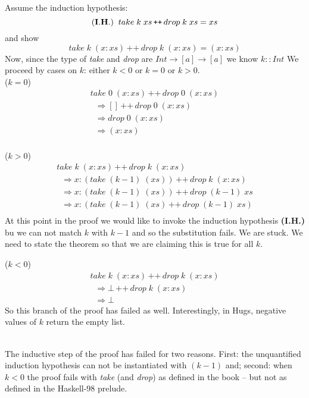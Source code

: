 \documentclass[11pt]{article}
\newcommand{\append}{\,{\texttt{++}}\,}
\begin{document}
 Assume  the induction hypothesis:
\[{\bf{(I.H.)}} \;\; take\; k\; xs \append drop\; k\; xs = xs \]
and show
\[take\; k\; (x:xs) \append drop\; k\; (x:xs) = (x:xs) \]
Now, since the type of {\it{take}} and {\it{drop}} are $Int \rightarrow [a]
\rightarrow [a]$ we know $k::Int$ We proceed by cases on $k$: either $k<0$ or
$k=0$ or $k>0$.\\
($k = 0$)
\[\begin{array}{l}
take\; 0\; (x:xs) \append drop\; 0\; (x:xs)\\
\;\;\Rightarrow [] \append drop \; 0\; (x:xs) \\
\;\;\Rightarrow drop \; 0\; (x:xs) \\
\;\;\Rightarrow (x:xs) \\
\end{array}\]


($k > 0$)
\[\begin{array}{l}
take\; k\; (x:xs) \append drop\; k\; (x:xs) \\
\;\;\Rightarrow x:(take\; (k-1)\; (xs)) \append drop \; k\; (x:xs) \\
\;\;\Rightarrow x:(take\; (k-1)\; (xs)) \append drop \; (k-1)\; xs \\
\;\;\Rightarrow x:(take\; (k-1)\; (xs) \append drop \; (k-1)\; xs) \\
\end{array}\]
At this point in the proof we would like to invoke the induction hypothesis
{\bf{(I.H.)}} bu we can not match $k$ with $k-1$ and so the substitution fails.
We are stuck.  We need to state the theorem so that we are claiming this is
true for all $k$.

($k < 0$)
\[\begin{array}{l}
take\; k\; (x:xs) \append drop\; k\; (x:xs) \\
\;\;\Rightarrow \bot \append drop \; k\; (x:xs) \\
\;\;\Rightarrow \bot
\end{array}\]
So this branch of the proof has failed as well.  Interestingly,
in Hugs, negative values of $k$ return the empty list.

\ \\ 

The inductive step of the proof has failed for two reasons. First: the
unquantified induction hypothesis can not be instantiated with $(k -1)$ and;
second: when $k < 0$ the proof fails with {\it{take}} (and {\it{drop}}) as
defined in the book -- but not as defined in the Haskell-98 prelude.
\end{document}
